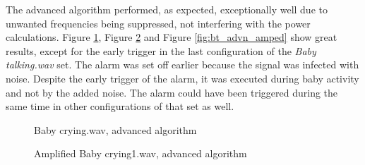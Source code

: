 The advanced algorithm performed, as expected, exceptionally well due to
unwanted frequencies being suppressed, not interfering with the power
calculations. Figure \ref{fig:bc1_advn}, Figure \ref{fig:bc2_advn_amped} and
Figure \ref{fig:bt_advn_amped} show great results, except for the early trigger 
in the last configuration of the \emph{Baby talking.wav} set. The alarm was set
off earlier because the signal was infected with noise. Despite the early
trigger of the alarm, it was executed during baby activity and not by the added
noise. The alarm could have been triggered during the same time in other
configurations of that set as well.

\begin{figure}[H]
  \centering
  \caption{Baby crying.wav, advanced algorithm}
  \label{fig:bc1_advn}
\end{figure}
\begin{figure}[H]
  \centering
  \caption{Amplified Baby crying1.wav, advanced algorithm}
  \label{fig:bc2_advn_amped}
\end{figure}
